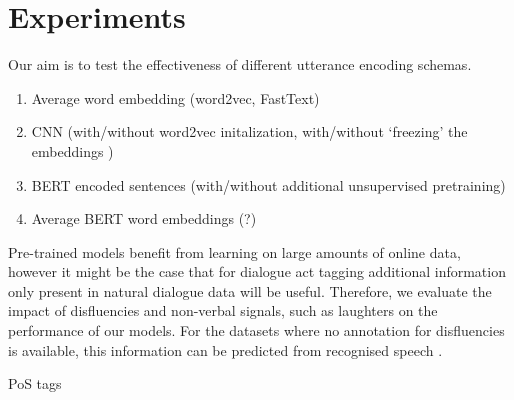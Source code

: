 \documentclass[11pt,a4paper]{article}
\begin{document}
\section{Experiments}
Our aim is to test the effectiveness of different utterance encoding schemas. 
\begin{enumerate}
  \item Average word embedding (word2vec, FastText)
  \item CNN (with/without word2vec initalization, with/without `freezing' the embeddings )
  \item BERT encoded sentences (with/without additional unsupervised pretraining)
  \item Average BERT word embeddings (?)
  \end{enumerate}

  Pre-trained models benefit from learning on large amounts of online data, however it might be the case that for dialogue act tagging additional information only present in natural dialogue data will be useful. Therefore, we evaluate the impact of disfluencies and non-verbal signals, such as laughters on the performance of our models. For the datasets where no annotation for disfluencies is available, this information can be predicted from recognised speech \citep{hough2017joint,shalyminov2018multi}.

  PoS tags

{}

\end{document}
